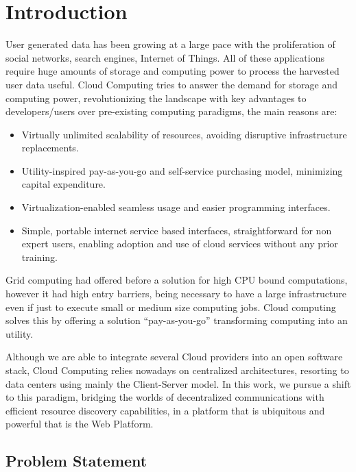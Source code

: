 
\section{Introduction}

User generated data has been growing at a large pace with the proliferation of social networks, search engines, Internet of Things. All of these applications require huge amounts of storage and computing power to process the harvested user data useful.
Cloud Computing tries to answer the demand for storage and computing power, revolutionizing the landscape with key advantages to developers/users over pre-existing computing paradigms, the main reasons are:

\begin{itemize}
    \item Virtually unlimited scalability of resources, avoiding disruptive infrastructure replacements.
    \item Utility-inspired pay-as-you-go and self-service purchasing model, minimizing capital expenditure.
    \item Virtualization-enabled seamless usage and easier programming interfaces.
    \item Simple, portable internet service based interfaces, straightforward for non expert users, enabling adoption and use of cloud services without any prior training.
\end{itemize}

Grid computing had offered before a solution for high CPU bound computations, however it had high entry barriers, being necessary to have a large infrastructure even if just to execute small or medium size computing jobs. Cloud computing solves this by offering a solution ``pay-as-you-go'' transforming computing into an utility.

Although we are able to integrate several Cloud providers into an open software stack, Cloud Computing relies nowadays on centralized architectures, resorting to data centers using mainly the Client-Server model. In this work, we pursue a shift to this paradigm, bridging the worlds of decentralized communications with efficient resource discovery capabilities, in a platform that is ubiquitous and powerful that is the Web Platform.

\subsection{Problem Statement}

